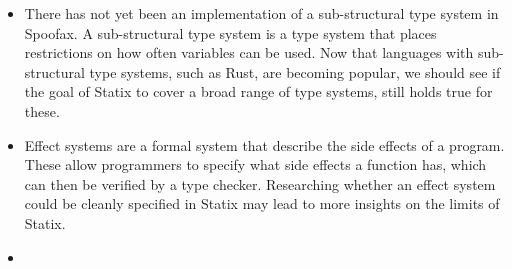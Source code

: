 \begin{itemize}
	\item There has not yet been an implementation of a sub-structural type system in Spoofax. A sub-structural type system is a type system that places restrictions on how often variables can be used. Now that languages with sub-structural type systems, such as Rust, are becoming popular, we should see if the goal of Statix to cover a broad range of type systems, still holds true for these. 
	\item Effect systems are a formal system that describe the side effects of a program. These allow programmers to specify what side effects a function has, which can then be verified by a type checker. Researching whether an effect system could be cleanly specified in Statix may lead to more insights on the limits of Statix.
	\item {}
\end{itemize}